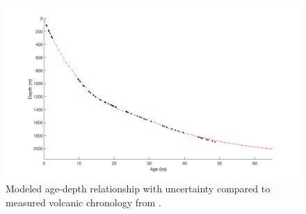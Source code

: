 \begin{figure}[h]
\centering
\includegraphics[scale=0.3]{figures/spaghetti}
\caption[]{Modeled age-depth relationship with uncertainty compared to measured volcanic chronology from \citet{hammer97}. }
\label{fig:layer_agedepth}
\end{figure}